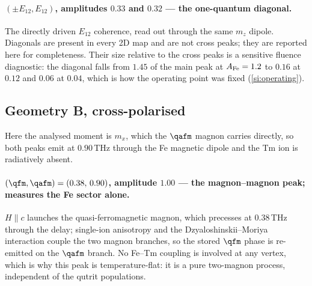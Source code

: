 \paragraph{$(\pm E_{12},E_{12})$, amplitudes $0.33$ and $0.32$ --- the
one-quantum diagonal.}
The directly driven $E_{12}$ coherence, read out through the same
$m_z$ dipole.  Diagonals are present in every 2D map and are not
cross peaks; they are reported here for completeness.  Their size
relative to the cross peaks is a sensitive fluence diagnostic: the
diagonal falls from $1.45$ of the main peak at $A_{\rm Fe}=1.2$ to
$0.16$ at $0.12$ and $0.06$ at $0.04$, which is how the operating point
was fixed (\cref{si:operating}).

\subsection{Geometry B, cross-polarised}
\label{si:peaksBcross}

Here the analysed moment is $m_x$, which the $\qafm$ magnon carries
directly, so both peaks emit at $0.90$\,THz through the Fe magnetic
dipole and the Tm ion is radiatively absent.

\paragraph{$(\qfm,\qafm)=(0.38,\,0.90)$, amplitude $1.00$ --- the
magnon--magnon peak; measures the Fe sector alone.}
$H\!\parallel\!c$ launches the quasi-ferromagnetic magnon, which
precesses at $0.38$\,THz through the delay; single-ion anisotropy and
the Dzyaloshinskii--Moriya interaction couple the two magnon branches,
so the stored $\qfm$ phase is re-emitted on the $\qafm$ branch.  No
Fe--Tm coupling is involved at any vertex, which is why this peak is
temperature-flat: it is a pure two-magnon process, independent of the
qutrit populations.

